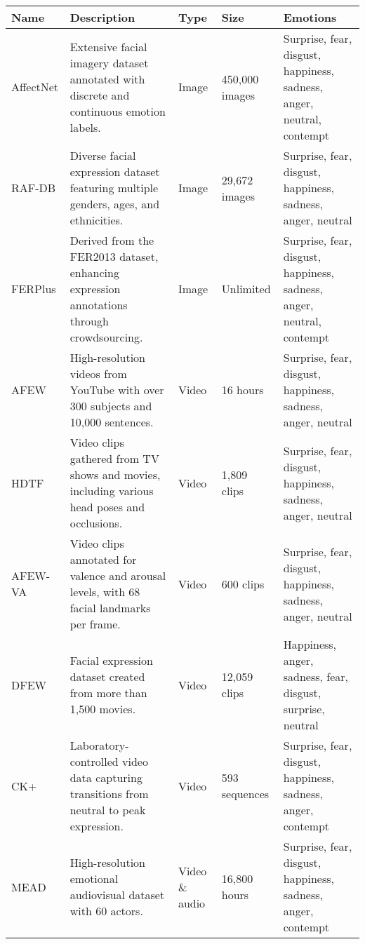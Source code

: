
\begin{table}[H]
\small
\centering
\begin{tabular}{|p{3cm}|p{5cm}|p{2cm}|p{2cm}|p{3cm}|}
\hline
\textbf{Name} & \textbf{Description} & \textbf{Type} & \textbf{Size} & \textbf{Emotions} \\ \hline

AffectNet & Extensive facial imagery dataset annotated with discrete and continuous emotion labels. & Image & 450,000 images & Surprise, fear, disgust, happiness, sadness, anger, neutral, contempt \\ \hline

RAF-DB & Diverse facial expression dataset featuring multiple genders, ages, and ethnicities. & Image & 29,672 images & Surprise, fear, disgust, happiness, sadness, anger, neutral \\ \hline

FERPlus & Derived from the FER2013 dataset, enhancing expression annotations through crowdsourcing. & Image & Unlimited & Surprise, fear, disgust, happiness, sadness, anger, neutral, contempt \\ \hline

AFEW & High-resolution videos from YouTube with over 300 subjects and 10,000 sentences. & Video & 16 hours & Surprise, fear, disgust, happiness, sadness, anger, neutral \\ \hline

HDTF & Video clips gathered from TV shows and movies, including various head poses and occlusions. & Video & 1,809 clips & Surprise, fear, disgust, happiness, sadness, anger, neutral \\ \hline

AFEW-VA & Video clips annotated for valence and arousal levels, with 68 facial landmarks per frame. & Video & 600 clips & Surprise, fear, disgust, happiness, sadness, anger, neutral \\ \hline

DFEW & Facial expression dataset created from more than 1,500 movies. & Video & 12,059 clips & Happiness, anger, sadness, fear, disgust, surprise, neutral \\ \hline

CK+ & Laboratory-controlled video data capturing transitions from neutral to peak expression. & Video & 593 sequences & Surprise, fear, disgust, happiness, sadness, anger, contempt \\ \hline

MEAD & High-resolution emotional audiovisual dataset with 60 actors. & Video \& audio & 16,800 hours & Surprise, fear, disgust, happiness, sadness, anger, contempt \\ \hline


\end{tabular}
\end{table}
